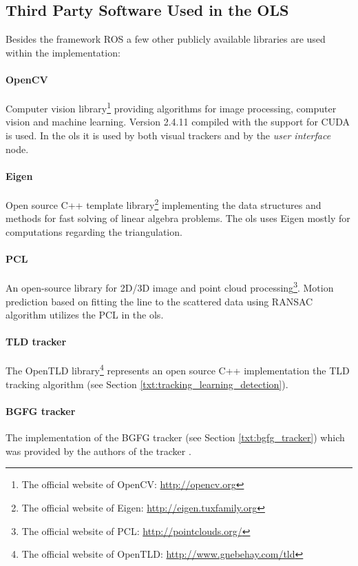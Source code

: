 \subsection{Third Party Software Used in the OLS} \label{txt:external_libraries}

Besides the framework ROS a few other publicly available libraries are used within the implementation:

\paragraph{OpenCV} Computer vision library\footnote{The official website of OpenCV: \url{http://opencv.org}} providing algorithms for image processing, computer vision and machine learning. Version 2.4.11 compiled with the support for CUDA is used. In the \gls{ols} it is used by both visual trackers and by the \textit{user interface} node.

\paragraph{Eigen} Open source C++ template library\footnote{The official website of Eigen: \url{http://eigen.tuxfamily.org}} implementing the data structures and methods for fast solving of linear algebra problems. The \gls{ols} uses Eigen mostly for computations regarding the triangulation.

\paragraph{PCL} An open-source library for 2D/3D image and point cloud processing\footnote{The official website of PCL: \url{http://pointclouds.org/}}. Motion prediction based on fitting the line to the scattered data using RANSAC algorithm utilizes the PCL in the \gls{ols}.

\paragraph{TLD tracker} The OpenTLD library\footnote{The official website of OpenTLD: \url{http://www.gnebehay.com/tld}} represents an open source C++ implementation the TLD tracking algorithm (see Section \ref{txt:tracking_learning_detection}).	

\paragraph{BGFG tracker} The implementation of the BGFG tracker (see Section \ref{txt:bgfg_tracker}) which was provided by the authors of the tracker \cite{ObjectTrackinginMonochromaticVideo}.

